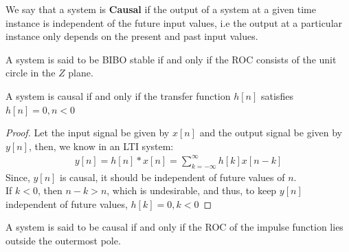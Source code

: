 \documentclass[journal,12pt,twocolumn]{IEEEtran}
\begin{document}
\begin{definition}
We say that a system is \textbf{Causal} if the output of a system at a given time instance is independent of the future input values, i.e the output at a particular instance only depends on the present and past input values.
\end{definition}

\begin{lemma}
A system is said to be BIBO stable if and only if the ROC consists of the unit circle in the $Z$ plane.
\end{lemma}
\begin{lemma}
A system is causal if and only if the transfer function $h[n]$ satisfies $h[n] = 0 , n<0$
\end{lemma}
\begin{proof}
Let the input signal be given by $x[n]$ and the output signal be given by $y[n]$, then, we know in an LTI system:
\begin{align}
    y[n] = h[n] * x[n] = \sum_{k = -\infty}^\infty h[k]x[n-k]
\end{align}
Since, $y[n]$ is causal, it should be independent of future values of $n$. \\
If $k < 0$, then $n - k > n$, which is undesirable, and thus, to keep $y[n]$ independent of future values, $h[k] = 0 , k< 0$
\end{proof}

\begin{lemma}
A system is said to be causal if and only if the ROC of the impulse function lies outside the outermost pole.
\label{Causal}
\end{lemma}
\end{document}
